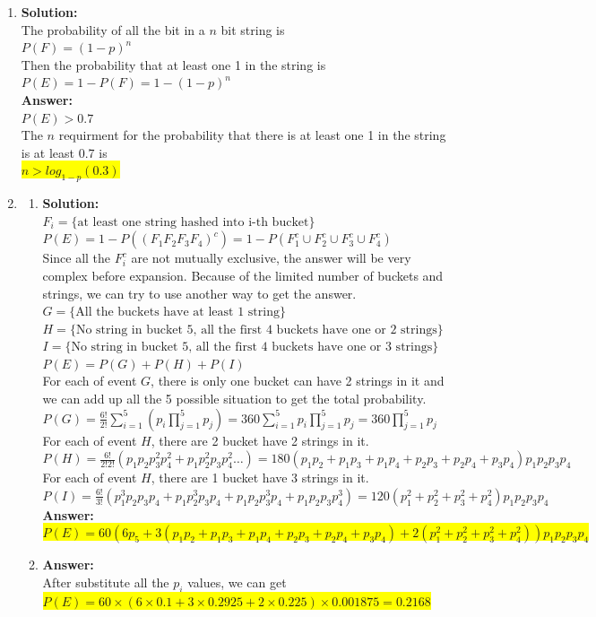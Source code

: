 \documentclass{article}
\newcommand{\myansw}{\textbf{Answer:}\\}
\newcommand{\mysolu}{\textbf{Solution:}\\}
\begin{document}
\begin{enumerate}
\begin{enumerate}
	\end{enumerate}
	\item
	\mysolu
	The probability of all the bit in a ${n}$ bit string is\\
	${P(F) = (1-p)^n}$\\
	Then the probability that at least one 1 in the string is\\
	${P(E) = 1- P(F)= 1-(1-p)^n}$\\
	\myansw
	${P(E)>0.7}$\\
	The ${n}$ requirment for the probability that there is at least one 1 in the string is at least 0.7 is\\
	\colorbox{yellow}{	
		${n>log_{1-p}(0.3)}$
	}\\
	\item
	\begin{enumerate}
		\item
		\mysolu
		${F_i=\{\text{at least one string hashed into i-th bucket}\}}$\\
		${P(E) = 1-P((F_1 F_2 F_3 F_4)^c)=1-P(F_1^c \cup F_2^c \cup F_3^c \cup F_4^c)}$\\
		Since all the ${F_i^c}$ are not mutually exclusive, the answer will be very complex before expansion.
		Because of the limited number of buckets and strings, we can try to use another way to get the answer.\\
		${G = \{\text{All the buckets have at least 1 string}\}}$\\
		${H = \{\text{No string in bucket 5, all the first 4 buckets have  one or 2 strings}\}}$\\
		${I = \{\text{No string in bucket 5, all the first 4 buckets have  one or 3 strings}\}}$\\
		${P(E)=P(G)+P(H)+P(I)}$\\
		For each of event ${G}$, there is only one bucket can have 2 strings in it and we can add up all the 5 possible situation to get the total probability.\\
		${P(G)=\frac{6!}{2!}\sum\limits_{i=1}^5(p_i\prod\limits_{j=1}^5p_j)=360\sum\limits_{i=1}^5 p_i\prod\limits_{j=1}^5p_j = 360\prod\limits_{j=1}^5p_j}$\\
		For each of event ${H}$, there are 2 bucket have 2 strings in it.\\
		${P(H)=\frac{6!}{2!2!}(p_1 p_2 p_3^2 p_4^2+p_1 p_2^2 p_3 p_4^2 \ldots)=180(p_1 p_2 + p_1 p_3 + p_1 p_4 + p_2 p_3 + p_2 p_4 + p_3 p_4)p_1 p_2 p_3 p_4}$\\
		For each of event ${H}$, there are 1 bucket have 3 strings in it.\\
		${P(I)=\frac{6!}{3!}(p_1^3 p_2 p_3 p_4 + p_1 p_2^3 p_3 p_4 + p_1 p_2 p_3^3 p_4+ p_1 p_2 p_3 p_4^3) = 120(p_1^2+p_2^2+p_3^2+p_4^2) p_1 p_2 p_3 p_4}$\\
		\myansw
		\colorbox{yellow}{
		${P(E)=60(6p_5 + 3(p_1 p_2 + p_1 p_3 + p_1 p_4 + p_2 p_3 + p_2 p_4 + p_3 p_4)+2(p_1^2+p_2^2+p_3^2+p_4^2))p_1p_2p_3p_4}$}\\
		\item
		\myansw
		After substitute all the ${p_i}$ values, we can get\\
		\colorbox{yellow}{
			${P(E)=60\times(6\times 0.1 + 3\times 0.2925+2\times 0.225)\times 0.001875=0.2168}$
		}
		

\end{enumerate}
\end{enumerate}
\end{document}
